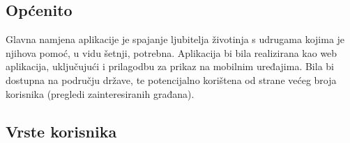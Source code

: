        \subsection{Općenito}
        
        Glavna namjena aplikacije je spajanje ljubitelja životinja s udrugama kojima je njihova pomoć, u vidu šetnji, potrebna. Aplikacija bi bila realizirana kao web aplikacija, uključujući i prilagodbu za prikaz na mobilnim uređajima. Bila bi dostupna na području države, te potencijalno korištena od strane većeg broja korisnika (pregledi zainteresiranih građana).
    
    \subsection{Vrste korisnika}
    
